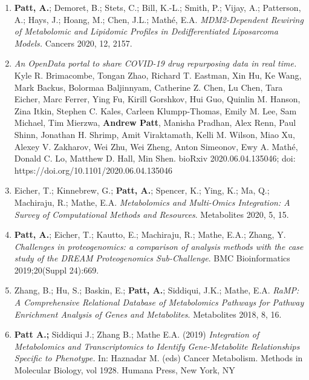 \documentclass[11pt,a4paper,sans]{moderncv}        %
\begin{document}
\begin{enumerate}

\item \textbf{Patt, A.}; Demoret, B.; Stets, C.; Bill, K.-L.; Smith, P.; Vijay, A.; Patterson, A.; Hays, J.; Hoang, M.; Chen, J.L.; Mathé, E.A. \emph{MDM2-Dependent Rewiring of Metabolomic and Lipidomic Profiles in Dedifferentiated Liposarcoma Models.} Cancers 2020, 12, 2157.

\item \emph{An OpenData portal to share COVID-19 drug repurposing data in real time.} Kyle R. Brimacombe, Tongan Zhao, Richard T. Eastman, Xin Hu, Ke Wang, Mark Backus, Bolormaa Baljinnyam, Catherine Z. Chen, Lu Chen, Tara Eicher, Marc Ferrer, Ying Fu, Kirill Gorshkov, Hui Guo, Quinlin M. Hanson, Zina Itkin, Stephen C. Kales, Carleen Klumpp-Thomas, Emily M. Lee, Sam Michael, Tim Mierzwa, \textbf{Andrew Patt}, Manisha Pradhan, Alex Renn, Paul Shinn, Jonathan H. Shrimp, Amit Viraktamath, Kelli M. Wilson, Miao Xu, Alexey V. Zakharov, Wei Zhu, Wei Zheng, Anton Simeonov, Ewy A. Mathé, Donald C. Lo, Matthew D. Hall, Min Shen. bioRxiv 2020.06.04.135046; doi: https://doi.org/10.1101/2020.06.04.135046
  
\item Eicher, T.; Kinnebrew, G.; \textbf{Patt, A.}; Spencer, K.; Ying, K.; Ma, Q.; Machiraju, R.; Mathe, E.A. \emph{Metabolomics and Multi-Omics Integration: A Survey of Computational Methods and Resources}. Metabolites 2020, 5, 15.

\item \textbf{Patt, A.}; Eicher, T.; Kautto, E.; Machiraju, R.; Mathe, E.A.; Zhang, Y. \emph{Challenges in proteogenomics: a comparison of analysis methods with the case study of the DREAM Proteogenomics Sub-Challenge}. BMC Bioinformatics 2019;20(Suppl 24):669.

\item Zhang, B.; Hu, S.; Baskin, E.; \textbf{Patt, A.}; Siddiqui, J.K.; Mathe, E.A. \emph{RaMP: A Comprehensive Relational Database of Metabolomics Pathways for Pathway Enrichment Analysis of Genes and Metabolites}. Metabolites 2018, 8, 16.

\item \textbf{Patt A.;} Siddiqui J.; Zhang B.; Mathe E.A. (2019) \emph{Integration of Metabolomics and Transcriptomics to Identify Gene-Metabolite Relationships Specific to Phenotype.} In: Haznadar M. (eds) Cancer Metabolism. Methods in Molecular Biology, vol 1928. Humana Press, New York, NY
\end{enumerate}
\end{document}
